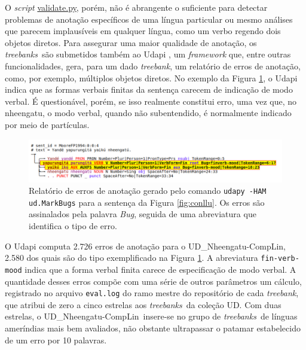 \documentclass[portuguese]{textolivre}
\newcommand{\udc}{coleção UD}
\newcommand{\tbc}{UD\_Nheengatu-CompLin}
\newcommand{\tbs}{\textit{treebanks}}
\newcommand{\tb}{\textit{treebank}}
\begin{document}
O \textit{script} \href{https://github.com/UniversalDependencies/tools/blob/master/validate.py}{validate.py}, porém, não é abrangente o suficiente para detectar problemas de anotação específicos de uma língua particular ou mesmo análises que parecem implausíveis em qualquer língua, como um verbo regendo dois objetos diretos. Para assegurar uma maior qualidade de anotação, os \tbs~são submetidos também ao Udapi \parencite{popel-etal-2017-udapi-k}, um \textit{framework} que, entre outras funcionalidades, gera, para um dado \tb, um relatório de erros de anotação, como, por exemplo, múltiplos objetos diretos. No exemplo da Figura \ref{fig:erro-udapi}, o Udapi indica que as formas verbais finitas da sentença carecem de indicação de modo verbal. É questionável, porém, se isso realmente constitui erro, uma vez que, no nheengatu, o modo verbal, quando não subentendido, é normalmente indicado por meio de partículas.

\begin{figure}[htbp]
  \centering
  \begin{minipage}{.9\textwidth}
    \includegraphics[width=\linewidth]{figures/erro-udapi.pdf}
    \caption{Relatório de erros de anotação gerado pelo comando \texttt{udapy -HAM ud.MarkBugs} para a sentença da Figura \ref{fig:conllu}. Os erros são assinalados pela palavra \textit{Bug}, seguida de uma abreviatura que identifica o tipo de erro.}
    \label{fig:erro-udapi}
  \end{minipage}
\end{figure}

O Udapi computa 2.726 erros de anotação para o \tbc, 2.580 dos quais são do tipo exemplificado na Figura \ref{fig:erro-udapi}. A abreviatura \texttt{fin-verb-mood} indica que a forma verbal finita carece de especificação de modo verbal. A quantidade desses erros compõe com uma série de outros parâmetros um cálculo, registrado no arquivo \texttt{eval.log} do ramo mestre do repositório de cada \tb, que atribui de zero a cinco estrelas aos \tbs~da \udc. Com duas estrelas, o \tbc~insere-se no grupo de \tbs~de línguas ameríndias mais bem avaliados, não obstante ultrapassar o patamar estabelecido de um erro por 10 palavras. 
\end{document}
